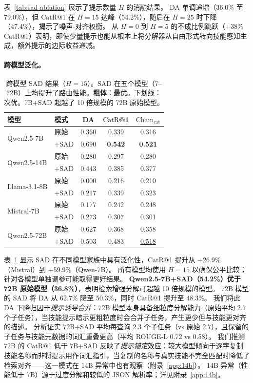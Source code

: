 \documentclass[11pt,a4paper]{ctexart}
\newcommand{\catrecall}{\text{CatR}}
\newcommand{\chaincat}{\text{Chain}_\text{cat}}
\begin{document}
表~\ref{tab:sad-ablation} 展示了提示数量 $H$ 的消融结果。
DA 单调递增（36.0\% 至 79.0\%），但 $\catrecall$@1 在 $H{=}15$ 达峰（54.2\%），随后在 $H{=}25$ 时下降（47.4\%），揭示了噪声-对齐权衡。
从 $H{=}0$ 到 $H{=}5$ 的不成比例跳跃（+38\% $\catrecall$@1）表明，即使少量提示也能从根本上将分解器从自由形式转向技能感知生成，额外提示的边际收益递减。

\paragraph{跨模型泛化。}

\begin{table}[t]
\centering
\small
\begin{tabular}{llccc}
\toprule
\textbf{模型} & \textbf{模式} & \textbf{DA} & $\catrecall$\textbf{@1} & $\chaincat$ \\
\midrule
\multirow{2}{*}{Qwen2.5-7B} & 原始 & 0.360 & 0.339 & 0.316 \\
 & +SAD & 0.690 & \textbf{0.542} & \textbf{0.521} \\
\midrule
\multirow{2}{*}{Qwen2.5-14B} & 原始 & 0.280 & 0.297 & 0.280 \\
 & +SAD & 0.443 & 0.385 & 0.377 \\
\midrule
\multirow{2}{*}{Llama-3.1-8B} & 原始 & 0.000 & 0.216 & 0.210 \\
 & +SAD & 0.217 & 0.339 & 0.323 \\
\midrule
\multirow{2}{*}{Mistral-7B} & 原始 & 0.177 & 0.242 & 0.248 \\
 & +SAD & 0.273 & 0.307 & 0.301 \\
\midrule
\multirow{2}{*}{Qwen2.5-72B} & 原始 & 0.627 & 0.368 & 0.358 \\
 & +SAD & 0.503 & 0.483 & \underline{0.518} \\
\bottomrule
\end{tabular}
\caption{跨模型 SAD 结果（$H{=}15$）。SAD 在五个模型（7--72B）上均提升了路由性能。\textbf{粗体}：最优。\underline{下划线}：次优。7B+SAD 超越了 10 倍规模的 72B 原始模型。}
\label{tab:sad-crossmodel}
\end{table}

表~\ref{tab:sad-crossmodel} 显示 SAD 在不同模型家族中具有泛化性，$\catrecall$@1 提升从 +26.9\%（Mistral）到 +59.9\%（Qwen-7B）。
所有模型均使用 $H{=}15$ 以确保公平比较；针对各模型单独调参可能取得更好结果。
\textbf{Qwen2.5-7B+SAD（54.2\%）优于 72B 原始模型（36.8\%）}，表明检索增强分解可超越 10 倍规模的模型。
72B 模型的 SAD 将 DA 从 62.7\% 降至 50.3\%，同时 $\catrecall$@1 提升至 48.3\%。
我们将此 DA 下降归因于\emph{提示诱导合并}：72B 模型本身具备细粒度分解能力（原始平均 2.7 个子任务），当技能提示暗示更粗粒度时会合并子任务，产生更少但与技能更对齐的描述。
分析证实 72B+SAD 平均每查询 2.3 个子任务（vs 原始 2.7），且保留的子任务与技能元数据的词汇重叠更高（平均 ROUGE-L 0.72 vs 0.58）。
我们推测 72B 的 $\catrecall$@1 低于 7B+SAD 反映了\emph{提示锚定}效应：较大模型倾向于逐字复制技能名称而非将提示用作词汇指引，当复制的名称与真实技能不完全匹配时降低了检索对齐——这一模式在 14B 异常中也有观察（附录~\ref{app:14b}）。
14B 异常（性能低于 7B）源于过度分解和较低的 JSON 解析率；详见附录~\ref{app:14b}。
\end{document}
